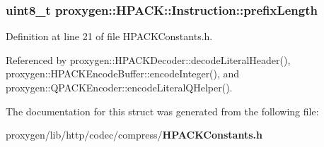 \subsubsection[{prefix\+Length}]{\setlength{\rightskip}{0pt plus 5cm}uint8\+\_\+t proxygen\+::\+H\+P\+A\+C\+K\+::\+Instruction\+::prefix\+Length}\label{structproxygen_1_1HPACK_1_1Instruction_a7be33c623cb24e6b9ac8e0185abc56c8}


Definition at line 21 of file H\+P\+A\+C\+K\+Constants.\+h.



Referenced by proxygen\+::\+H\+P\+A\+C\+K\+Decoder\+::decode\+Literal\+Header(), proxygen\+::\+H\+P\+A\+C\+K\+Encode\+Buffer\+::encode\+Integer(), and proxygen\+::\+Q\+P\+A\+C\+K\+Encoder\+::encode\+Literal\+Q\+Helper().



The documentation for this struct was generated from the following file\+:\begin{DoxyCompactItemize}
\item 
proxygen/lib/http/codec/compress/{\bf H\+P\+A\+C\+K\+Constants.\+h}\end{DoxyCompactItemize}

